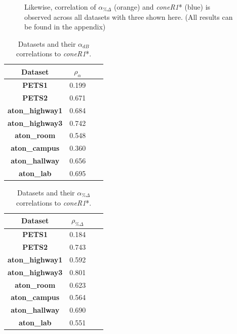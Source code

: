 \begin{figure}
\caption{Likewise, correlation of $\alpha_{\%\Delta}$ (orange) and \textit{coneR1}* (blue) is observed across all datasets with three shown here. (All results can be found in the appendix)}
\label{fig:corr_rgb}
\end{figure}

\begin{table}
\centering
\begin{tabular}{ |c|c|c|c| }
	\hline
	\textbf{Dataset} & \textbf{$\rho_{\alpha}$} \\
	\hline
	\hline
	\textbf{PETS1} & 0.199 \\
	\hline
	\textbf{PETS2} & 0.671 \\
	\hline
	\textbf{aton\_highway1} & 0.684 \\
	\hline
	\textbf{aton\_highway3} & 0.742 \\
	\hline
	\textbf{aton\_room} & 0.548 \\
	\hline
	\textbf{aton\_campus} & 0.360 \\
	\hline
	\textbf{aton\_hallway} & 0.656 \\
	\hline
	\textbf{aton\_lab} &  0.695 \\
	\hline
\end{tabular}
\caption{Datasets and their $\alpha_{dB}$ correlations to \textit{coneR1}*.}
\label{table:corr_db}
\end{table}

\begin{table}
\centering
\begin{tabular}{ |c|c|c|c| }
	\hline
	\textbf{Dataset} & \textbf{$\rho_{\%\Delta}$} \\
	\hline
	\hline
	\textbf{PETS1} & 0.184 \\
	\hline
	\textbf{PETS2} & 0.743 \\
	\hline
	\textbf{aton\_highway1} & 0.592 \\
	\hline
	\textbf{aton\_highway3} & 0.801 \\
	\hline
	\textbf{aton\_room} & 0.623 \\
	\hline
	\textbf{aton\_campus} & 0.564 \\
	\hline
	\textbf{aton\_hallway} & 0.690 \\
	\hline
	\textbf{aton\_lab} & 0.551 \\
	\hline
\end{tabular}
\caption{Datasets and their $\alpha_{\%\Delta}$ correlations to \textit{coneR1}*.}
\label{table:corr_rgb}
\end{table}

